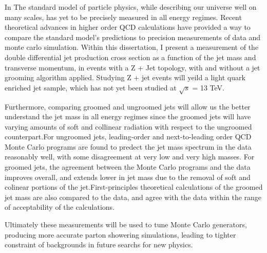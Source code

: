 
In The standard model of particle physics, while describing our universe well on many scales, has yet to be precisely measured in all energy regimes. Recent theoretical advances in higher order QCD calculations have provided a way to compare the standard model's predictions to precision measurements of data and monte carlo simulation. Within this dissertation, I present a measurement of the double differential jet production cross section as a function of the jet mass and transverse momentum, in events with a Z + Jet topology, with and without a jet grooming algorithm applied. Studying Z + jet events will yeild a light quark enriched jet sample, which has not yet been studied at $\sqrt{s}$ = 13 TeV. 

Furthermore, comparing groomed and ungroomed jets will allow us the better understand the jet mass in all energy regimes since the groomed jets will have varying amounts of soft and collinear radiation with respect to the ungroomed counterpart.For ungroomed jets, leading-order and next-to-leading order QCD Monte Carlo programs are found to predect the jet mass spectrum in the data reasonably well, with some disagreement at very low and very high masses. For groomed jets, the agreement between the Monte Carlo programs and the data improves overall, and extends lower in jet mass due to the removal of soft and colinear portions of the jet.First-principles theoretical calculations of the groomed jet mass are also compared to the data, and agree with the data within the range of acceptability of the calculations. 

Ultimately these measurements will be used to tune Monte Carlo generators, producing more accurate parton showering simulations, leading to tighter constraint of backgrounds in future searchs for new physics.

